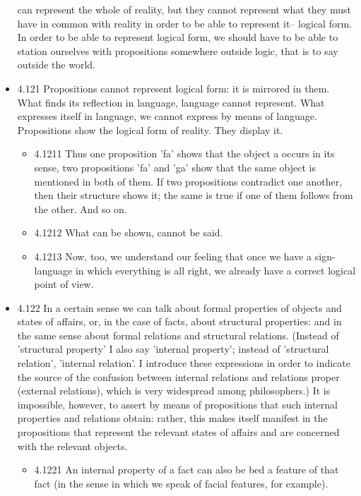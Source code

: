 \documentclass[11pt]{article}
\begin{document}
\begin{itemize}
can represent the whole of reality, but they cannot represent what they
must have in common with reality in order to be able to represent it--
logical form. In order to be able to represent logical form, we should have
to be able to station ourselves with propositions somewhere outside logic,
that is to say outside the world.
\item 4.121
\label{sec:org0e3b0bf}
Propositions cannot represent logical form: it is mirrored in them.
What finds its reflection in language, language cannot represent. What
expresses itself in language, we cannot express by means of language.
Propositions show the logical form of reality. They display it.
\begin{itemize}
\item 4.1211
\label{sec:org3f50d60}
Thus one proposition 'fa' shows that the object a occurs in its
sense, two propositions 'fa' and 'ga' show that the same object is
mentioned in both of them. If two propositions contradict one another, then
their structure shows it; the same is true if one of them follows from the
other. And so on.
\item 4.1212
\label{sec:org33f2d80}
What can be shown, cannot be said.
\item 4.1213
\label{sec:orgcd89e85}
Now, too, we understand our feeling that once we have a sign-
language in which everything is all right, we already have a correct
logical point of view.
\end{itemize}
\item 4.122
\label{sec:orged474fc}
In a certain sense we can talk about formal properties of objects and
states of affairs, or, in the case of facts, about structural properties:
and in the same sense about formal relations and structural relations.
(Instead of 'structural property' I also say 'internal property'; instead
of 'structural relation', 'internal relation'. I introduce these
expressions in order to indicate the source of the confusion between
internal relations and relations proper (external relations), which is very
widespread among philosophers.) It is impossible, however, to assert by
means of propositions that such internal properties and relations obtain:
rather, this makes itself manifest in the propositions that represent the
relevant states of affairs and are concerned with the relevant objects.
\begin{itemize}
\item 4.1221
\label{sec:org06b376e}
An internal property of a fact can also be bed a feature of that
fact (in the sense in which we speak of facial features, for example).

\end{itemize}
\end{itemize}
\end{document}
